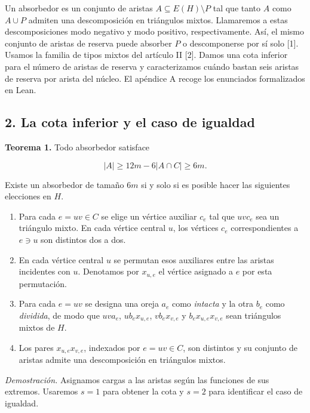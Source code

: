 \documentclass[spanish,11pt,a4paper]{article}
\providecommand{\tightlist}{\setlength{\itemsep}{0pt}\setlength{\parskip}{0pt}}
\begin{document}
Un absorbedor es un conjunto de aristas \(A\subseteq E(H)\setminus P\) tal que tanto \(A\) como \(A\cup P\) admiten una descomposición en triángulos mixtos. Llamaremos a estas descomposiciones modo negativo y modo positivo, respectivamente. Así, el mismo conjunto de aristas de reserva puede absorber \(P\) o descomponerse por sí solo {[}1{]}. Usamos la familia de tipos mixtos del artículo II {[}2{]}. Damos una cota inferior para el número de aristas de reserva y caracterizamos cuándo bastan seis aristas de reserva por arista del núcleo. El apéndice A recoge los enunciados formalizados en Lean.

\clearpage\subsection{2. La cota inferior y el caso de igualdad}\label{la-cota-inferior-y-el-caso-de-igualdad}

\textbf{Teorema 1.} Todo absorbedor satisface

\[
|A|\ge 12m-6|A\cap C|\ge 6m.
\]

Existe un absorbedor de tamaño \(6m\) si y solo si es posible hacer las siguientes elecciones en \(H\).

\begin{enumerate}
\def\labelenumi{\arabic{enumi}.}
\tightlist
\item
  Para cada \(e=uv\in C\) se elige un vértice auxiliar \(c_e\) tal que \(uvc_e\) sea un triángulo mixto. En cada vértice central \(u\), los vértices \(c_e\) correspondientes a \(e\ni u\) son distintos dos a dos.
\item
  En cada vértice central \(u\) se permutan esos auxiliares entre las aristas incidentes con \(u\). Denotamos por \(x_{u,e}\) el vértice asignado a \(e\) por esta permutación.
\item
  Para cada \(e=uv\) se designa una oreja \(a_e\) como \emph{intacta} y la otra \(b_e\) como \emph{dividida}, de modo que \(uva_e\), \(ub_ex_{u,e}\), \(vb_ex_{v,e}\) y \(b_ex_{u,e}x_{v,e}\) sean triángulos mixtos de \(H\).
\item
  Los pares \(x_{u,e}x_{v,e}\), indexados por \(e=uv\in C\), son distintos y su conjunto de aristas admite una descomposición en triángulos mixtos.
\end{enumerate}

\emph{Demostración.} Asignamos cargas a las aristas según las funciones de sus extremos. Usaremos \(s=1\) para obtener la cota y \(s=2\) para identificar el caso de igualdad.
\end{document}
